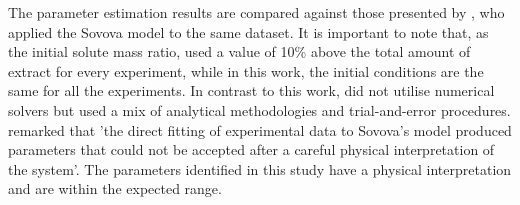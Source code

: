 \documentclass[a4paper,fleqn]{cas-dc}
\begin{document}
The parameter estimation results are compared against those presented by \citet{Povh2001}, who applied the Sovova model to the same dataset. It is important to note that, as the initial solute mass ratio, \citet{Povh2001} used  a value of 10\% above the total amount of extract for every experiment, while in this work, the initial conditions are the same for all the experiments. In contrast to this work, \citet{Povh2001} did not utilise numerical solvers but used a mix of analytical methodologies and trial-and-error procedures. \citet{Povh2001} remarked that 'the direct fitting of experimental data to Sovova's model produced parameters that could not be accepted after a careful physical interpretation of the system'. The parameters identified in this study have a physical interpretation and are within the expected range.
\end{document}
